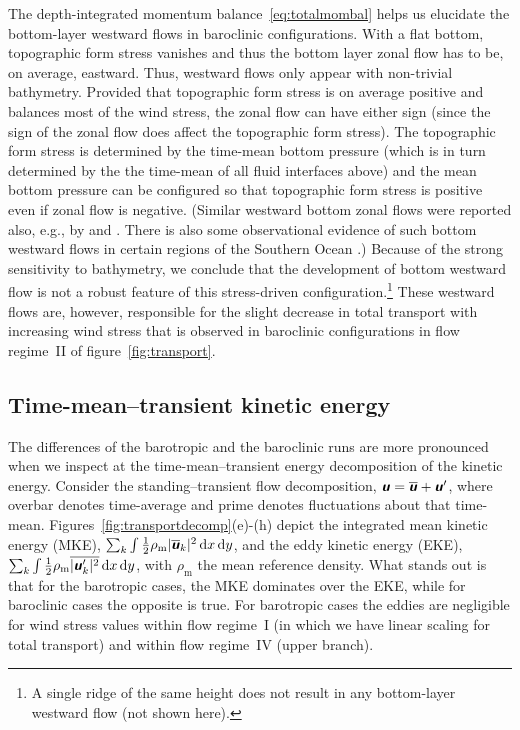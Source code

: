 \documentclass{agujournal2019}
\newcommand{\mathbfit}[1]{\textbf{\textit{\textsf{#1}}}}
\newcommand{\bu}		{\mathbfit u}
\newcommand{\half}		{\tfrac{1}{2}}
\newcommand{\rhom} {\rho_{\mathrm{m}}}
\begin{document}
The depth-integrated momentum balance~\eqref{eq:totalmombal} helps us elucidate the bottom-layer westward flows in baroclinic configurations. With a flat bottom, topographic form stress vanishes and thus the bottom layer zonal flow has to be, on average, eastward. Thus, westward flows only appear with non-trivial bathymetry. Provided that topographic form stress is on average positive and balances most of the wind stress, the zonal flow can have either sign (since the sign of the zonal flow does affect the topographic form stress). The topographic form stress is determined by the time-mean bottom pressure (which is in turn determined by the the time-mean of all fluid interfaces above) and the mean bottom pressure can be configured so that topographic form stress is positive even if zonal flow is negative. (Similar westward bottom zonal flows were reported also, e.g., by  and . There is also some observational evidence of such bottom westward flows in certain regions of the Southern Ocean \cite{Cunningham-Barker-1996}.) Because of the strong sensitivity to bathymetry, we conclude that the development of bottom westward flow is not a robust feature of this stress-driven configuration.\footnote{A single ridge of the same height does not result in any bottom-layer westward flow (not shown here).} These westward flows are, however,  responsible for the slight decrease in total transport with increasing wind stress that is observed in baroclinic configurations in flow regime~II of figure~\ref{fig:transport}.




\subsection{Time-mean--transient kinetic energy}\label{sec:resultdetails2}

The differences of the barotropic and the baroclinic runs are more pronounced when we inspect at the time-mean--transient energy decomposition of the kinetic energy. Consider the standing--transient flow decomposition, $\bu = \overline{\bu}+\bu'$, where overbar denotes time-average and prime denotes fluctuations about that time-mean. Figures~\ref{fig:transportdecomp}(e)-(h) depict the integrated mean kinetic energy (MKE), $\sum_k \int\half \rhom |\overline{\bu}_k|^2\,\mathrm{d}x\,\mathrm{d}y$, and the eddy kinetic energy (EKE),  $\sum_k \int \half\rhom \overline{|\bu'_k|^2}\,\mathrm{d}x\,\mathrm{d}y$, with $\rhom$ the mean reference density. What stands out is that for the barotropic cases, the MKE dominates over the EKE, while for baroclinic cases the opposite is true. For barotropic cases the eddies are negligible for wind stress values within flow regime~I (in which we have linear scaling for total transport) and within flow regime~IV (upper branch).
\end{document}
